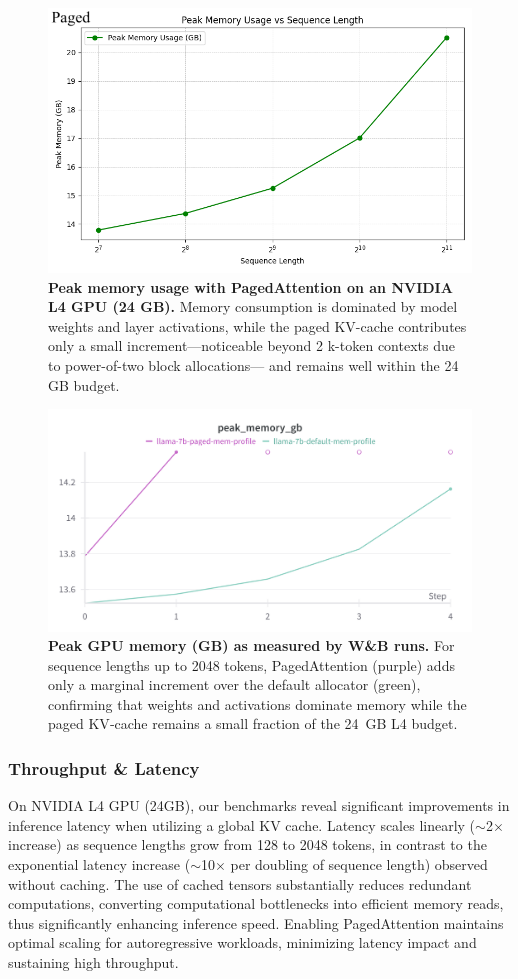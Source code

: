 \documentclass[conference]{IEEEtran}
\begin{document}
\begin{figure}[t]
  \centering
  \includegraphics[width=0.8\linewidth]{images/profile_memory_paged_plot.png}
  \caption{%
    \textbf{Peak memory usage with PagedAttention on an NVIDIA L4 GPU (24 GB).}
    Memory consumption is dominated by model weights and layer activations,
    while the paged KV-cache contributes only a small increment—noticeable
    beyond 2 k-token contexts due to power-of-two block allocations—
    and remains well within the 24 GB budget.}
  \label{fig:mem_paged_l4}
\end{figure}

\begin{figure}[t]
  \centering
  \includegraphics[width=0.6\linewidth]{images/wandb_peak_memory_gb.png}
  \caption{\textbf{Peak GPU memory (GB) as measured by W\&B runs.}  For sequence lengths up to 2048 tokens, PagedAttention (purple) adds only a marginal increment over the default allocator (green), confirming that weights and activations dominate memory while the paged KV‑cache remains a small fraction of the 24~GB L4 budget.}
  \label{fig:wb_memory}
\end{figure}

\subsubsection{Throughput \& Latency}
On NVIDIA L4 GPU (24GB), our benchmarks reveal significant improvements in inference latency when utilizing a global KV cache. Latency scales linearly ($\sim$2$\times$ increase) as sequence lengths grow from 128 to 2048 tokens, in contrast to the exponential latency increase ($\sim$10$\times$ per doubling of sequence length) observed without caching. The use of cached tensors substantially reduces redundant computations, converting computational bottlenecks into efficient memory reads, thus significantly enhancing inference speed. Enabling PagedAttention maintains optimal scaling for autoregressive workloads, minimizing latency impact and sustaining high throughput.
\end{document}
